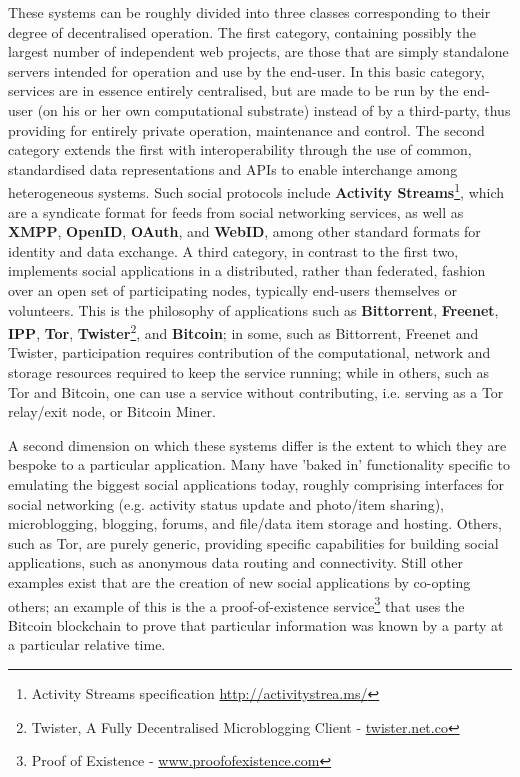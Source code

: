 \documentclass{sig-alternate}
\begin{document}
These systems can be roughly divided into three classes corresponding to their degree of decentralised operation.  The first category, containing possibly the largest number of independent web projects, are those that are simply standalone servers intended for operation and use by the end-user.  In this basic category, services are in essence entirely centralised, but are made to be run by the end-user (on his or her own computational substrate) instead of by a third-party, thus providing for entirely private operation, maintenance and control.  The second category extends the first with interoperability through the use of common, standardised data representations and APIs to enable interchange among heterogeneous systems.  Such social protocols include \textbf{Activity Streams}\footnote{Activity Streams specification \url{http://activitystrea.ms/}}, which are a syndicate format for feeds from social networking services, as well as \textbf{XMPP}, \textbf{OpenID}, \textbf{OAuth}, and \textbf{WebID}, among other standard formats for identity and data exchange.  A third category, in contrast to the first two, implements social applications in a distributed, rather than federated, fashion over an open set of participating nodes, typically end-users themselves or volunteers.  This is the philosophy of applications such as \textbf{Bittorrent}, \textbf{Freenet}, \textbf{IPP}, \textbf{Tor}, \textbf{Twister}\footnote{Twister, A Fully Decentralised Microblogging Client - \url{twister.net.co}}, and \textbf{Bitcoin}; in some, such as Bittorrent, Freenet and Twister, participation requires contribution of the computational, network and storage resources required to keep the service running; while in others, such as Tor and Bitcoin, one can use a service without contributing, i.e. serving as a Tor relay/exit node, or Bitcoin Miner.

A second dimension on which these systems differ is the extent to which they are bespoke to a particular application.  Many have 'baked in' functionality specific to emulating the biggest social applications today, roughly comprising interfaces for social networking (e.g. activity status update and photo/item sharing), microblogging, blogging, forums, and file/data item storage and hosting.  Others, such as Tor, are purely generic, providing specific capabilities for building social applications, such as  anonymous data routing and connectivity.  Still other examples exist that are the creation of new social applications by co-opting others; an example of this  is the a proof-of-existence service\footnote{Proof of Existence - \url{www.proofofexistence.com}} that uses the Bitcoin blockchain to prove that particular information was known by a party at a particular relative time.
\end{document}
